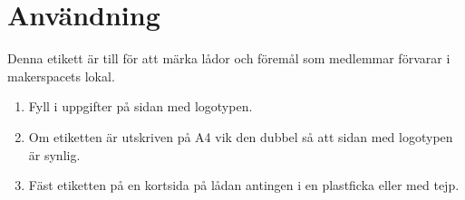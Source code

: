 \documentclass{article}
\begin{document}
\section*{Användning}

Denna etikett är till för att märka lådor och föremål som medlemmar förvarar i makerspacets lokal.

\begin{enumerate}
  \item Fyll i uppgifter på sidan med logotypen.
  \item Om etiketten är utskriven på A4 vik den dubbel så att sidan med logotypen är synlig.
  \item Fäst etiketten på en kortsida på lådan antingen i  en plastficka eller med tejp.
\end{enumerate}
\end{document}
